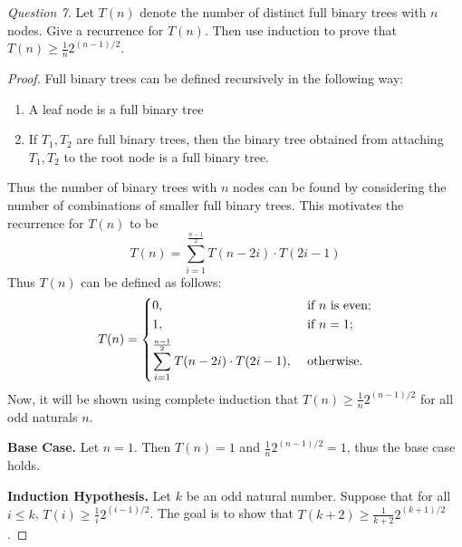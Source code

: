 \documentclass[11pt]{article}
\begin{document}
    \textit{Question 7.} Let \(T(n)\) denote the number of distinct full binary trees with \(n\) nodes. Give a recurrence for \(T(n)\). Then use induction to prove that \(T(n)\geq \frac{1}{n}2^{(n-1) / 2}\).

    \begin{proof}
        Full binary trees can be defined recursively in the following way:
        \begin{enumerate}
            \item A leaf node is a full binary tree
            \item If \(T_1,T_2\) are full binary trees, then the binary tree obtained from attaching \(T_1,T_2\) to the root node is a full binary tree.
        \end{enumerate}
        Thus the number of binary trees with \(n\) nodes can be found by considering the number of combinations of smaller full binary trees. This motivates the recurrence for \(T(n)\) to be
        \[
            T(n) = \sum_{i=1}^{\frac{n-1}{2}} T(n-2i) \cdot T(2i - 1)
        \]
        Thus \(T(n)\) can be defined as follows:
        \[
            T(n) = \begin{dcases}
                0, &\text{ if } n \text{ is even}  ;\\
                1, &\text{ if } n=1 ;\\
                \sum_{i=1}^{\frac{n-1}{2}} T(n-2i) \cdot T(2i - 1), &\text{ otherwise} .
            \end{dcases}
        \]
        Now, it will be shown using complete induction that \(T(n)\geq \frac{1}{n}2^{(n-1) / 2}\) for all odd naturals \(n\).

        \textbf{Base Case.} Let \(n=1\). Then \(T(n) = 1\) and \(\frac{1}{n}2^{(n-1) / 2} = 1\), thus the base case holds.

        \textbf{Induction Hypothesis.} Let \(k\) be an odd natural number. Suppose that for all \(i \leq k\), \(T(i) \geq \frac{1}{i}2^{(i-1) / 2}\). The goal is to show that \(T(k+2) \geq \frac{1}{k+2}2^{(k+1) / 2}\).


\end{proof}
\end{document}
